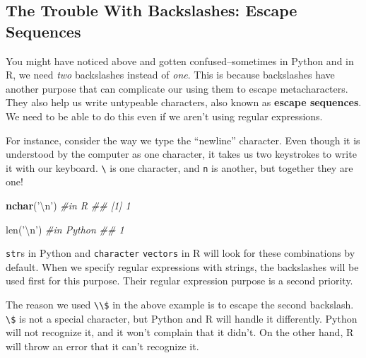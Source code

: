 \documentclass[12pt,krantz2]{krantz}
\makeatletter
\newenvironment{Shaded}{\begin{snugshade}}{\end{snugshade}}
\newcommand{\BuiltInTok}[1]{#1}
\newcommand{\CharTok}[1]{\textcolor[rgb]{0.5,0.5,0.5}{#1}}
\newcommand{\CommentTok}[1]{\textcolor[rgb]{0.37,0.37,0.37}{\textit{#1}}}
\newcommand{\KeywordTok}[1]{\textcolor[rgb]{0.27,0.27,0.27}{\textbf{#1}}}
\newcommand{\NormalTok}[1]{#1}
\newcommand{\StringTok}[1]{\textcolor[rgb]{0.5,0.5,0.5}{#1}}
\newenvironment{kframe}{%
\medskip{}
\setlength{\fboxsep}{.8em}
 \def\at@end@of@kframe{}%
 \ifinner\ifhmode%
  \def\at@end@of@kframe{\end{minipage}}%
  \begin{minipage}{\columnwidth}%
 \fi\fi%
 \def\FrameCommand##1{\hskip\@totalleftmargin \hskip-\fboxsep
 \colorbox{shadecolor}{##1}\hskip-\fboxsep
     \hskip-\linewidth \hskip-\@totalleftmargin \hskip\columnwidth}%
 \MakeFramed {\advance\hsize-\width
   \@totalleftmargin\z@ \linewidth\hsize
   \@setminipage}}%
 {\par\unskip\endMakeFramed%
 \at@end@of@kframe}
\renewenvironment{Shaded}{\begin{kframe}}{\end{kframe}}
\makeatother
\begin{document}
\hypertarget{the-trouble-with-backslashes-escape-sequences}{%
\subsection{The Trouble With Backslashes: Escape Sequences}\label{the-trouble-with-backslashes-escape-sequences}}

You might have noticed above and gotten confused--sometimes in Python and in R, we need \emph{two} backslashes instead of \emph{one}. This is because backslashes have another purpose that can complicate our using them to escape metacharacters. They also help us write untypeable characters, also known as \textbf{escape sequences}. We need to be able to do this even if we aren't using regular expressions.

For instance, consider the way we type the ``newline'' character. Even though it is understood by the computer as one character, it takes us two keystrokes to write it with our keyboard. \texttt{\textbackslash{}} is one character, and \texttt{n} is another, but together they are one!

\begin{Shaded}
\begin{Highlighting}[]
\KeywordTok{nchar}\NormalTok{(}\StringTok{'}\CharTok{\textbackslash{}n}\StringTok{'}\NormalTok{) }\CommentTok{#in R}
\CommentTok{## [1] 1}
\end{Highlighting}
\end{Shaded}

\begin{Shaded}
\begin{Highlighting}[]
\BuiltInTok{len}\NormalTok{(}\StringTok{'}\CharTok{\textbackslash{}n}\StringTok{'}\NormalTok{) }\CommentTok{#in Python}
\CommentTok{## 1}
\end{Highlighting}
\end{Shaded}

\texttt{str}s in Python and \texttt{character} \texttt{vectors} in R will look for these combinations by default. When we specify regular expressions with strings, the backslashes will be used first for this purpose. Their regular expression purpose is a second priority.

The reason we used \texttt{\textbackslash{}\textbackslash{}\$} in the above example is to escape the second backslash. \texttt{\textbackslash{}\$} is not a special character, but Python and R will handle it differently. Python will not recognize it, and it won't complain that it didn't. On the other hand, R will throw an error that it can't recognize it.
\end{document}
